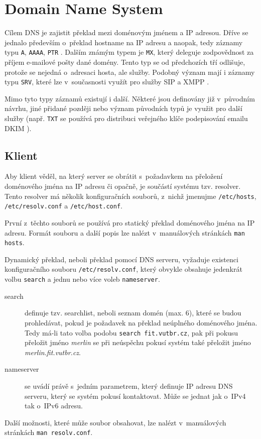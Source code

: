 \section{Domain Name System}
\label{dns}
Cílem DNS je zajistit překlad mezi doménovým jménem a IP adresou. Dříve se jednalo především o~překlad hostname na IP adresu a naopak, tedy záznamy typu {\tt A}, {\tt AAAA}, {\tt PTR} \cite{rfc1035,rfc3596}. Dalším známým typem je {\tt MX}, který deleguje zodpovědnost za příjem e-mailové pošty dané domény. Tento typ se od předchozích tří odlišuje, protože se nejedná o~adresaci hosta, ale služby. Podobný význam mají i záznamy typu {\tt SRV}, které lze v~současnosti využít pro služby SIP a XMPP \cite{rfc2782}.

Mimo tyto typy záznamů existují i další. Některé jsou definovány již v~původním návrhu, jiné přidané později nebo význam původních typů je využit pro další služby (např. {\tt TXT} se používá pro distribuci veřejného klíče podepisování emailu DKIM \cite{rfc4871}).

\subsection{Klient}
Aby klient věděl, na který server se obrátit s~požadavkem na přeložení doménového jména na IP adresu či opačně, je součástí systému tzv. resolver. Tento resolver má několik konfiguračních souborů, z~nichž jmenujme {\tt /etc/hosts}, {\tt /etc/resolv.conf} a {\tt /etc/host.conf}.

První z~těchto souborů se používá pro statický překlad doménového jména na IP adresu. Formát souboru a další popis lze nalézt v~manuálových stránkách {\tt man hosts}.

Dynamický překlad, neboli překlad pomocí DNS serveru, vyžaduje existenci konfiguračního souboru {\tt /etc/resolv.conf}, který obvykle obsahuje jedenkrát volbu {\tt search} a jednu nebo více voleb {\tt nameserver}.
\begin{description}
  \item[search] definuje tzv. searchlist, neboli seznam domén (max. 6), které se budou prohledávat, pokud je požadavek na překlad neúplného doménového jména. Tedy má-li tato volba podobu {\tt search fit.vutbr.cz}, pak při pokusu přeložit jméno {\em merlin} se při neúspěchu pokusí systém také přeložit jméno {\em merlin.fit.vutbr.cz}.
  \item[nameserver] se uvádí právě s~jedním parametrem, který definuje IP adresu DNS serveru, který se systém pokusí kontaktovat. Může se jednat jak o~IPv4 tak o~IPv6 adresu.
\end{description}
Další možnosti, které může soubor obsahovat, lze nalézt v~manuálových stránkách {\tt man resolv.conf}.

